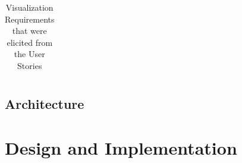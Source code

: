 \begin{table}[]
\begin{tabular}{|p{1.1cm}|p{12cm}|}
\end{tabular}
\caption{Visualization Requirements that were elicited from the User Stories}
\label{table:2}
\end{table}

\section{Architecture}

\chapter{Design and Implementation}